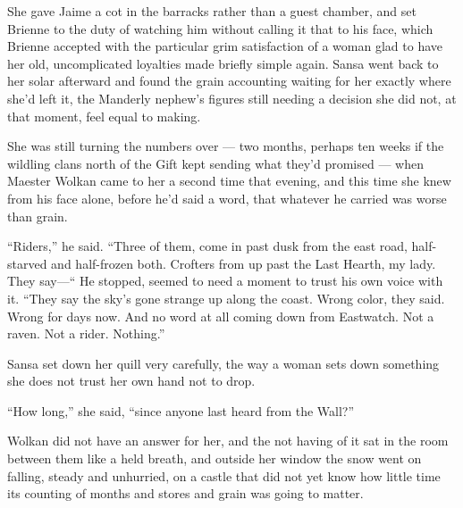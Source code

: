 \sceneBreak

She gave Jaime a cot in the barracks rather than a guest chamber, and set Brienne to the duty of watching him without calling it that to his face, which Brienne accepted with the particular grim satisfaction of a woman glad to have her old, uncomplicated loyalties made briefly simple again. Sansa went back to her solar afterward and found the grain accounting waiting for her exactly where she’d left it, the Manderly nephew’s figures still needing a decision she did not, at that moment, feel equal to making.

She was still turning the numbers over — two months, perhaps ten weeks if the wildling clans north of the Gift kept sending what they’d promised — when Maester Wolkan came to her a second time that evening, and this time she knew from his face alone, before he’d said a word, that whatever he carried was worse than grain.

“Riders,” he said. “Three of them, come in past dusk from the east road, half-starved and half-frozen both. Crofters from up past the Last Hearth, my lady. They say—“ He stopped, seemed to need a moment to trust his own voice with it. “They say the sky’s gone strange up along the coast. Wrong color, they said. Wrong for days now. And no word at all coming down from Eastwatch. Not a raven. Not a rider. Nothing.”

Sansa set down her quill very carefully, the way a woman sets down something she does not trust her own hand not to drop.

“How long,” she said, “since anyone last heard from the Wall?”

Wolkan did not have an answer for her, and the not having of it sat in the room between them like a held breath, and outside her window the snow went on falling, steady and unhurried, on a castle that did not yet know how little time its counting of months and stores and grain was going to matter.